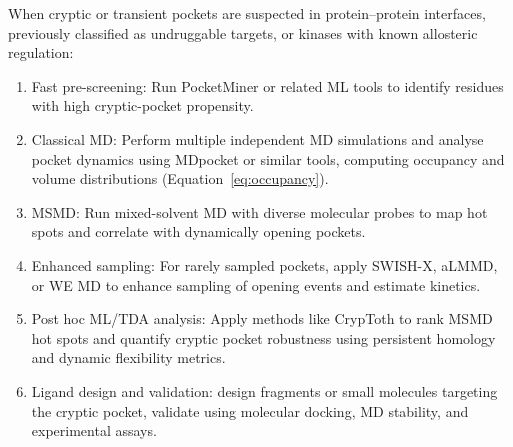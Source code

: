 \documentclass[12pt]{article}
\begin{document}
When cryptic or transient pockets are suspected in protein--protein interfaces, previously classified as undruggable targets, or kinases with known allosteric regulation:
\begin{enumerate}
    \item Fast pre-screening: Run PocketMiner or related ML tools to identify residues with high cryptic-pocket propensity.
    \item Classical MD: Perform multiple independent MD simulations and analyse pocket dynamics using MDpocket or similar tools, computing occupancy and volume distributions (Equation~\ref{eq:occupancy}).
    \item MSMD: Run mixed-solvent MD with diverse molecular probes to map hot spots and correlate with dynamically opening pockets.
    \item Enhanced sampling: For rarely sampled pockets, apply SWISH-X, aLMMD, or WE MD to enhance sampling of opening events and estimate kinetics.
    \item Post hoc ML/TDA analysis: Apply methods like CrypToth to rank MSMD hot spots and quantify cryptic pocket robustness using persistent homology and dynamic flexibility metrics.
    \item Ligand design and validation: design fragments or small molecules targeting the cryptic pocket, validate using molecular docking, MD stability, and experimental assays.
\end{enumerate}




\end{document}
